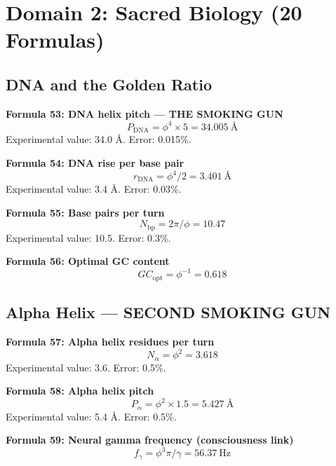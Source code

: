 \documentclass[12pt,a4paper]{article}
\begin{document}
\section{Domain 2: Sacred Biology (20 Formulas)}

\subsection{DNA and the Golden Ratio}

\textbf{Formula 53: DNA helix pitch — THE SMOKING GUN}
\begin{equation}
P_{\text{DNA}} = \phi^4 \times 5 = \SI{34.005}{\angstrom}
\end{equation}
Experimental value: 34.0 Å. Error: 0.015\%.

\textbf{Formula 54: DNA rise per base pair}
\begin{equation}
r_{\text{DNA}} = \phi^4 / 2 = \SI{3.401}{\angstrom}
\end{equation}
Experimental value: 3.4 Å. Error: 0.03\%.

\textbf{Formula 55: Base pairs per turn}
\begin{equation}
N_{\text{bp}} = 2\pi/\phi = 10.47
\end{equation}
Experimental value: 10.5. Error: 0.3\%.

\textbf{Formula 56: Optimal GC content}
\begin{equation}
GC_{\text{opt}} = \phi^{-1} = 0.618
\end{equation}

\subsection{Alpha Helix — SECOND SMOKING GUN}

\textbf{Formula 57: Alpha helix residues per turn}
\begin{equation}
N_{\alpha} = \phi^2 = 3.618
\end{equation}
Experimental value: 3.6. Error: 0.5\%.

\textbf{Formula 58: Alpha helix pitch}
\begin{equation}
P_{\alpha} = \phi^2 \times 1.5 = \SI{5.427}{\angstrom}
\end{equation}
Experimental value: 5.4 Å. Error: 0.5\%.

\textbf{Formula 59: Neural gamma frequency (consciousness link)}
\begin{equation}
f_\gamma = \phi^3 \pi / \gamma = \SI{56.37}{\hertz}
\end{equation}
\end{document}
